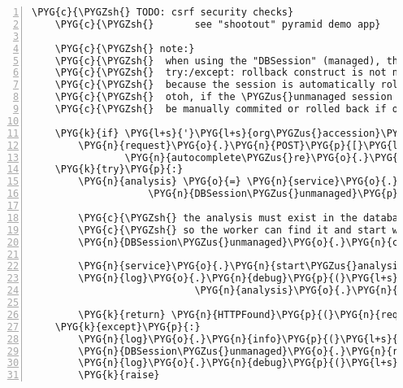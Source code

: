 \begin{Verbatim}[commandchars=\\\{\},numbers=left,firstnumber=1,stepnumber=5]
    \PYG{c}{\PYGZsh{} TODO: csrf security checks}
    \PYG{c}{\PYGZsh{}       see "shootout" pyramid demo app}

    \PYG{c}{\PYGZsh{} note:}
    \PYG{c}{\PYGZsh{}  when using the "DBSession" (managed), the}
    \PYG{c}{\PYGZsh{}  try:/except: rollback construct is not needed}
    \PYG{c}{\PYGZsh{}  because the session is automatically rolled back}
    \PYG{c}{\PYGZsh{}  otoh, if the \PYGZus{}unmanaged session is used, it \PYGZus{}has\PYGZus{} to}
    \PYG{c}{\PYGZsh{}  be manually commited or rolled back if objects are modified}

    \PYG{k}{if} \PYG{l+s}{'}\PYG{l+s}{org\PYGZus{}accession}\PYG{l+s}{'} \PYG{o+ow}{in} \PYG{n}{request}\PYG{o}{.}\PYG{n}{POST}\PYG{p}{:}
        \PYG{n}{request}\PYG{o}{.}\PYG{n}{POST}\PYG{p}{[}\PYG{l+s}{'}\PYG{l+s}{org\PYGZus{}accession}\PYG{l+s}{'}\PYG{p}{]} \PYG{o}{=} \PYGZbs{}
                \PYG{n}{autocomplete\PYGZus{}re}\PYG{o}{.}\PYG{n}{sub}\PYG{p}{(}\PYG{l+s}{r"}\PYG{l+s}{\PYGZbs{}}\PYG{l+s}{1}\PYG{l+s}{"}\PYG{p}{,} \PYG{n}{request}\PYG{o}{.}\PYG{n}{POST}\PYG{p}{[}\PYG{l+s}{'}\PYG{l+s}{org\PYGZus{}accession}\PYG{l+s}{'}\PYG{p}{]}\PYG{p}{)}
    \PYG{k}{try}\PYG{p}{:}
        \PYG{n}{analysis} \PYG{o}{=} \PYG{n}{service}\PYG{o}{.}\PYG{n}{get\PYGZus{}analysis}\PYG{p}{(}
                    \PYG{n}{DBSession\PYGZus{}unmanaged}\PYG{p}{,} \PYG{n}{attributes}\PYG{o}{=}\PYG{n}{request}\PYG{o}{.}\PYG{n}{POST}\PYG{p}{)}

        \PYG{c}{\PYGZsh{} the analysis must exist in the database}
        \PYG{c}{\PYGZsh{} so the worker can find it and start working}
        \PYG{n}{DBSession\PYGZus{}unmanaged}\PYG{o}{.}\PYG{n}{commit}\PYG{p}{(}\PYG{p}{)}

        \PYG{n}{service}\PYG{o}{.}\PYG{n}{start\PYGZus{}analysis}\PYG{p}{(}\PYG{n}{analysis}\PYG{p}{)}
        \PYG{n}{log}\PYG{o}{.}\PYG{n}{debug}\PYG{p}{(}\PYG{l+s}{"}\PYG{l+s}{started analysis \PYGZsh{}}\PYG{l+s+si}{\PYGZpc{}d}\PYG{l+s}{ by }\PYG{l+s}{'}\PYG{l+s+si}{\PYGZpc{}s}\PYG{l+s}{'}\PYG{l+s}{"} \PYG{o}{\PYGZpc{}} \PYG{p}{(}
                            \PYG{n}{analysis}\PYG{o}{.}\PYG{n}{id}\PYG{p}{,} \PYG{n}{analysis}\PYG{o}{.}\PYG{n}{owner}\PYG{o}{.}\PYG{n}{name}\PYG{p}{)}\PYG{p}{)}

        \PYG{k}{return} \PYG{n}{HTTPFound}\PYG{p}{(}\PYG{n}{request}\PYG{o}{.}\PYG{n}{route\PYGZus{}path}\PYG{p}{(}\PYG{l+s}{'}\PYG{l+s}{analysis}\PYG{l+s}{'}\PYG{p}{,} \PYG{n+nb}{id}\PYG{o}{=}\PYG{n}{analysis}\PYG{o}{.}\PYG{n}{id}\PYG{p}{)}\PYG{p}{)}
    \PYG{k}{except}\PYG{p}{:}
        \PYG{n}{log}\PYG{o}{.}\PYG{n}{info}\PYG{p}{(}\PYG{l+s}{"}\PYG{l+s}{abort}\PYG{l+s}{"}\PYG{p}{)}
        \PYG{n}{DBSession\PYGZus{}unmanaged}\PYG{o}{.}\PYG{n}{rollback}\PYG{p}{(}\PYG{p}{)}
        \PYG{n}{log}\PYG{o}{.}\PYG{n}{debug}\PYG{p}{(}\PYG{l+s}{"}\PYG{l+s}{rollback complete}\PYG{l+s}{"}\PYG{p}{)}
        \PYG{k}{raise}
\end{Verbatim}


